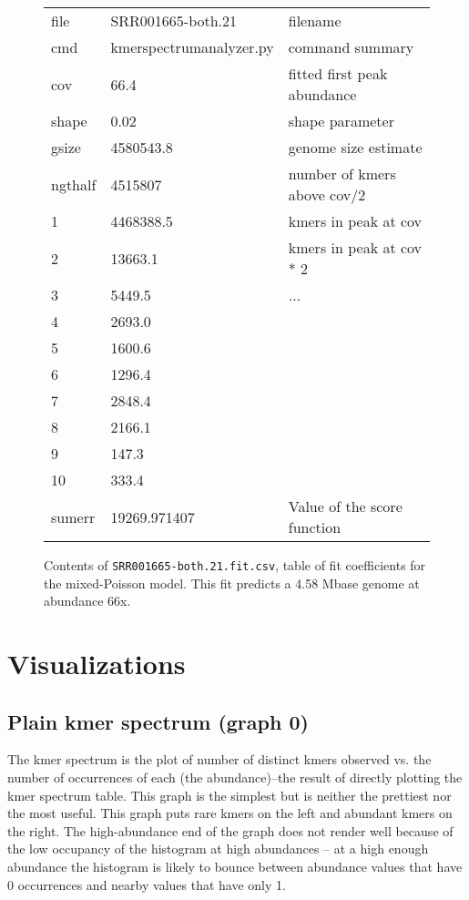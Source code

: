 \documentclass[11pt,fullpage]{article}
\begin{document}
\begin{figure}
\begin{tabular}{lll}
\hline
file &     SRR001665-both.21 & filename \\
cmd   &  kmerspectrumanalyzer.py &  command summary\\
cov   &  66.4                   & fitted first peak abundance \\
shape &  0.02                   & shape parameter \\
gsize &  4580543.8              & genome size  estimate \\
ngthalf & 4515807               & number of kmers above cov/2 \\
1     &  4468388.5              & kmers in peak at cov \\
2     &  13663.1                & kmers in peak at cov * 2 \\
3     &  5449.5                 & ... \\
4     &  2693.0 &  \\
5     &  1600.6 &  \\
6     &  1296.4 &  \\
7     &  2848.4 &  \\
8     &  2166.1 &  \\
9     &  147.3  &  \\
10    &  333.4  &  \\
sumerr & 19269.971407 & Value of the score function \\
\hline
\end{tabular}
\caption{Contents of \texttt{SRR001665-both.21.fit.csv}, table of fit coefficients for the mixed-Poisson model.
This fit predicts a 4.58 Mbase genome at abundance 66x.}
\label{fitparameters}
\end{figure}

\section{Visualizations}
\subsection{Plain kmer spectrum (graph 0)}
The kmer spectrum is the plot of number of distinct kmers observed vs. the number of
occurrences of each (the abundance)--the result of directly plotting the kmer
spectrum table.  This graph is the simplest but is neither the
prettiest nor the most useful.  This graph puts rare kmers on the left and
abundant kmers on the right.  The high-abundance end of the graph does not render well
because of the low occupancy of the histogram at high abundances -- at a high enough
abundance the histogram is likely to bounce between abundance values that have 0
occurrences and nearby values that have only 1.
\end{document}
